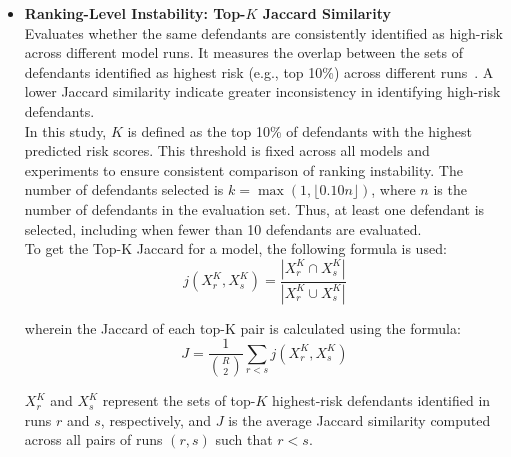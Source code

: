 \documentclass[12pt]{article}
\begin{document}
\begin{itemize}
    The following formula is used to calculate the CII per defendant $ d $:
    \[ \text{CII}_d = \frac{\text{flips}_d}{\binom{R}{2}} \]

    where the no.\ of label flips per defendant $ \text{flips}_d $ is calculated using:
    \[ \text{flips}_d = \sum_{r<s} \mathbf{1}\big(y_d^{(r)} \ne y_d^{(s)}\big) \]
    
    $ y_d^{(r)} $ is the predicted class label for defendant $ d $ in run $ r $, $ \mathbf{1}(\cdot) $ is the indicator function that equals 1 when the condition is true and 0 otherwise. \\

    Moreover, the total number of unique runs $ \binom{R}{2} $ is calculated using:
    \[ \binom{R}{2} = \frac{R(R-1)}{2} \] 

  \item \textbf{Ranking-Level Instability: Top-$ K$ Jaccard Similarity} \\
    \tabto{2em} Evaluates whether the same defendants are consistently identified as high-risk across different model runs. It measures the overlap between the sets of defendants identified as highest risk (e.g., top 10\%) across different runs~\cite{lopez2022instability}. A lower Jaccard similarity indicate greater inconsistency in identifying high-risk defendants.\\

    In this study, $K$ is defined as the top 10\% of defendants with the highest predicted risk scores. This threshold is fixed across all models and experiments to ensure consistent comparison of ranking instability. The number of defendants selected is $k=\max(1,\lfloor0.10n\rfloor)$, where $n$ is the number of defendants in the evaluation set. Thus, at least one defendant is selected, including when fewer than 10 defendants are evaluated.\\

    To get the Top-K Jaccard for a model, the following formula is used:
    \[ j(X_r^K,X_s^K)=\frac{|X_r^K \cap X_s^K|}{|X_r^K \cup X_s^K|} \]

    wherein the Jaccard of each top-K pair is calculated using the formula:
    \[ J=\frac{1}{\binom{R}{2}}\sum_{r<s}j(X_r^K,X_s^K) \]

    $ X_r^K $ and $ X_s^K $ represent the sets of top-$ K$ highest-risk defendants identified in runs $ r $ and $ s $, respectively, and $ J $ is the average Jaccard similarity computed across all pairs of runs $ (r,s) $ such that $ r < s $.
\end{itemize}
\end{document}
